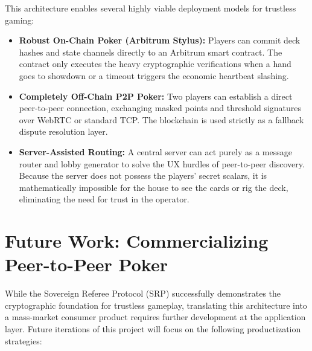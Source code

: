 \documentclass[11pt, a4paper]{article}
\begin{document}
This architecture enables several highly viable deployment models for trustless gaming:
\begin{itemize}
    \item \textbf{Robust On-Chain Poker (Arbitrum Stylus):} Players can commit deck hashes and state channels directly to an Arbitrum smart contract. The contract only executes the heavy cryptographic verifications when a hand goes to showdown or a timeout triggers the economic heartbeat slashing.
    \item \textbf{Completely Off-Chain P2P Poker:} Two players can establish a direct peer-to-peer connection, exchanging masked points and threshold signatures over WebRTC or standard TCP. The blockchain is used strictly as a fallback dispute resolution layer.
    \item \textbf{Server-Assisted Routing:} A central server can act purely as a message router and lobby generator to solve the UX hurdles of peer-to-peer discovery. Because the server does not possess the players' secret scalars, it is mathematically impossible for the house to see the cards or rig the deck, eliminating the need for trust in the operator.
\end{itemize}

\section{Future Work: Commercializing Peer-to-Peer Poker}
While the Sovereign Referee Protocol (SRP) successfully demonstrates the cryptographic foundation for trustless gameplay, translating this architecture into a mass-market consumer product requires further development at the application layer. Future iterations of this project will focus on the following productization strategies:
\end{document}
